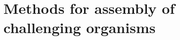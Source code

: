 %
\chapter{Methods for assembly of challenging organisms}

\ifpdf
    \graphicspath{{Chapter3/Figs/Raster/}{Chapter3/Figs/PDF/}{Chapter3/Figs/}}
\else
    \graphicspath{{Chapter3/Figs/Vector/}{Chapter3/Figs/}}
\fi



